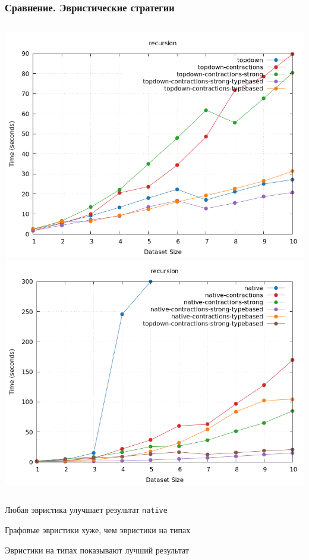 \documentclass{beamer}
\begin{document}
\begin{frame}\frametitle{Сравнение. Эвристические стратегии}
  \begin{columns}
    \includegraphics[width=\textwidth]{topdown.png}
    \includegraphics[width=\textwidth]{native.png}
  \end{columns}

  \bigskip
  \centering
  Любая эвристика улучшает результат \texttt{native}
  \bigskip

  Графовые эвристики хуже, чем эвристики на типах
  \bigskip

  Эвристики на типах показывают лучший результат
\end{frame}
\end{document}
